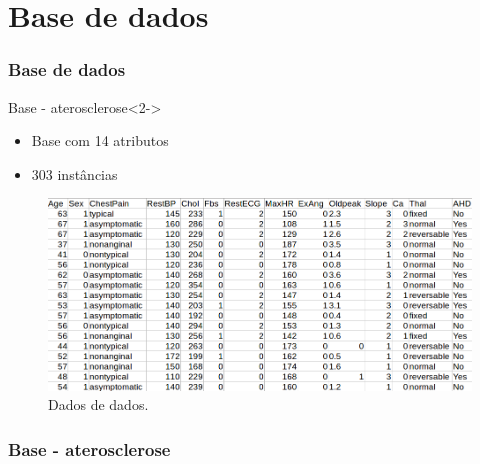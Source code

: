 \documentclass{beamer}
\theoremstyle{theorem}
\theoremstyle{definition}
\begin{document}
\section{Base de dados}
\begin{frame}
\frametitle{Base de dados}
\begin{block}{Base - aterosclerose}<2->
	\begin{itemize}
		\item<2-> Base com 14 atributos
		\item<3-> 303 instâncias
	\end{itemize}
\end{block}
\end{frame}

\begin{frame}
	\begin{figure}[htbp]
		\includegraphics[scale=.30]{fig/Bd1.png}
		\caption{Dados de dados.}
	\end{figure}
\end{frame}

\begin{frame}
\frametitle{Base - aterosclerose}	

\begin{figure}[h]
\setcounter{subfigure}{0}
	\center
	\pause
	\quad
	\pause
	\quad
	
\end{figure}
\end{frame}
\end{document}

